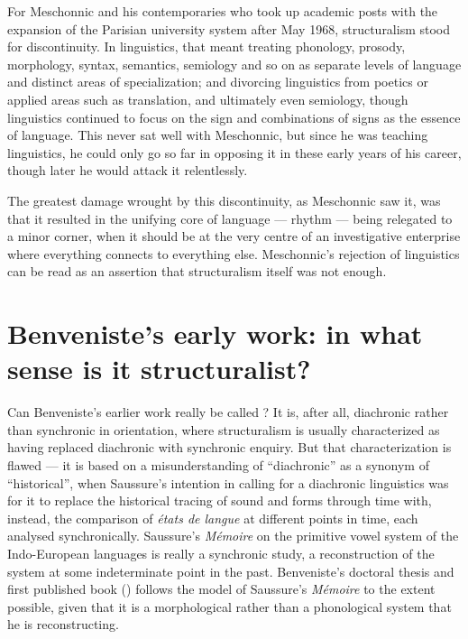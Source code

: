 \documentclass[output=paper]{langscibook}
\begin{document}
For Meschonnic and his contemporaries who took up academic posts with the expansion of the Parisian university system after May 1968, structuralism stood for discontinuity. In linguistics, that meant treating phonology, prosody, morphology, syntax, semantics, semiology and so on as separate levels of language and distinct areas of specialization; and divorcing linguistics from poetics or applied areas such as translation, and ultimately even semiology, though linguistics continued to focus on the sign and combinations of signs as the essence of language. This never sat well with Meschonnic, but since he was teaching linguistics, he could only go so far in opposing it in these early years of his career, though later he would attack it relentlessly.

The greatest damage wrought by this discontinuity, as Meschonnic saw it, was that it resulted in the unifying core of language — rhythm — being relegated to a minor corner, when it should be at the very centre of an investigative enterprise where everything connects to everything else. Meschonnic's rejection of  linguistics can be read as an assertion that structuralism itself was not  enough.

\section{Benveniste’s early work: in what sense is it structuralist?}
\label{sec:joseph:earlywork}

Can Benveniste's earlier work really be called ? It is, after all, diachronic rather than synchronic in orientation, where structuralism is usually characterized as having replaced diachronic with synchronic enquiry. But that characterization is flawed — it is based on a misunderstanding of ``diachronic'' as a synonym of ``historical'', when Saussure's intention in calling for a diachronic linguistics was for it to replace the historical tracing of sound and forms through time with, instead, the comparison of \emph{états de langue} at different points in time, each analysed synchronically. Saussure's \citeyear{Saussure1879} \emph{Mémoire} on the primitive vowel system of the Indo-European languages is really a synchronic study, a reconstruction of the system at some indeterminate point in the past. Benveniste's doctoral thesis and first published book (\citeyear{Benveniste1935}) follows the model of Saussure's \emph{Mémoire} to the extent possible, given that it is a morphological rather than a phonological system that he is reconstructing. 
\end{document}
